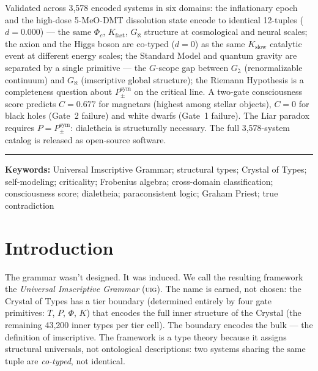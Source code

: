 \documentclass[12pt,a4paper]{article}
\newcommand{\Ppms}{P_{\pm}^{\text{sym}}}
\newcommand{\UIG}{\textsc{uig}}
\begin{document}
Validated across 3,578 encoded systems in six domains: the inflationary epoch and the
high-dose 5-MeO-DMT dissolution state encode to identical 12-tuples ($d = 0.000$) ---
the same $\Phi_c$, $K_\text{fast}$, $G_\aleph$ structure at cosmological and neural
scales; the axion and the Higgs boson are co-typed ($d = 0$) as the same
$K_\text{slow}$ catalytic event at different energy scales; the Standard Model and
quantum gravity are separated by a single primitive --- the $G$-scope gap between
$G_\gimel$ (renormalizable continuum) and $G_\aleph$ (imscriptive global structure);
the Riemann Hypothesis is a completeness question about $\Ppms$ on the critical line. A
two-gate consciousness score predicts $C = 0.677$ for magnetars (highest among stellar
objects), $C = 0$ for black holes (Gate~2 failure) and white dwarfs (Gate~1 failure).
The Liar paradox requires $P = \Ppms$: dialetheia is structurally necessary. The full
3,578-system catalog is released as open-source software.
\begin{center}
\rule{0.5\textwidth}{0.4pt}
\end{center}

\noindent\textbf{Keywords:} Universal Imscriptive Grammar; structural types;
Crystal of Types; self-modeling; criticality; Frobenius algebra;
cross-domain classification; consciousness score; dialetheia;
paraconsistent logic; Graham Priest; true contradiction

\newpage

\section{Introduction}
\label{sec:intro}

The grammar wasn't designed. It was induced. We call the resulting
framework the \emph{Universal Imscriptive Grammar} (\UIG). The name is earned,
not chosen: the Crystal of Types has a tier boundary (determined
entirely by four gate primitives: $T$, $P$, $\Phi$, $K$) that
encodes the full inner structure of the Crystal
(the remaining 43,200 inner types per tier cell). The boundary encodes
the bulk --- the definition of imscriptive. The framework is a type
theory because it assigns structural universals, not ontological
descriptions: two systems sharing the same tuple are \emph{co-typed},
not identical.
\end{document}
